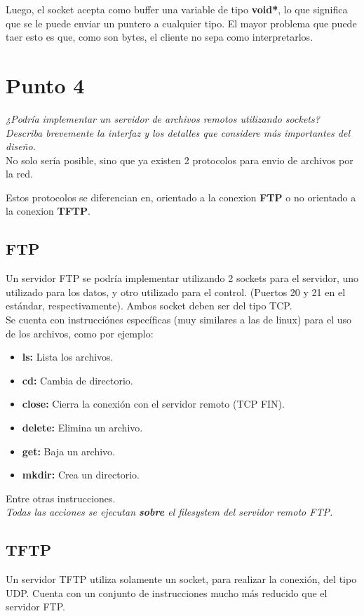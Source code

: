 \documentclass[12pt,journal,compsoc]{IEEEtran}
\begin{document}
Luego, el socket acepta como buffer una variable de tipo \textbf{void*}, lo que significa que se le puede
enviar un puntero a cualquier tipo. El mayor problema que puede taer esto es que, como son bytes,
el cliente no sepa como interpretarlos.

\section{Punto 4}

\textit{¿Podría implementar un servidor de archivos remotos utilizando sockets?\\Describa
brevemente la interfaz y los detalles que considere más importantes del diseño.}\\

No solo sería posible, sino que ya existen 2 protocolos para envio de archivos por la red.

Estos protocolos se diferencian en, orientado a la conexion \textbf{FTP} o no orientado a la
conexion \textbf{TFTP}.

\subsection{FTP}
Un servidor FTP se podría implementar utilizando 2 sockets para el servidor, uno utilizado para los datos,
y otro utilizado para el control. (Puertos 20 y 21 en el estándar, respectivamente).
Ambos socket deben ser del tipo TCP.\\
Se cuenta con instrucciónes específicas (muy similares a las de linux) para el uso de los archivos, como por ejemplo:
\begin{itemize}
  \item \textbf{ls:} Lista los archivos.
  \item \textbf{cd:} Cambia de directorio.
  \item \textbf{close:} Cierra la conexión con el servidor remoto (TCP FIN).
  \item \textbf{delete:} Elimina un archivo.
  \item \textbf{get:} Baja un archivo.
  \item \textbf{mkdir:} Crea un directorio.
\end{itemize}
Entre otras instrucciones.\\
\textit{Todas las acciones se ejecutan \textbf{sobre} el filesystem del servidor remoto FTP.}


\subsection{TFTP}
Un servidor TFTP utiliza solamente un socket, para realizar la conexión, del tipo UDP.
Cuenta con un conjunto de instrucciones mucho más reducido que el servidor FTP.
\end{document}
